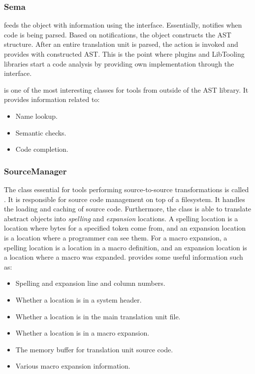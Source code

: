 \subsubsection{Sema}
 feeds the  object with information using the  interface. Essentially,  notifies  when code is being parsed. Based on notifications, the  object constructs the AST structure. After an entire translation unit is parsed, the  action is invoked and  provides  with constructed AST. This is the point where plugins and LibTooling libraries start a code analysis by providing own  implementation through the  interface.

 is one of the most interesting classes for tools from outside of the AST library. It provides information related to:

\begin{itemize}
\item Name lookup.
\item Semantic checks.
\item Code completion.
\end{itemize}

\subsubsection{SourceManager}
The class essential for tools performing source-to-source transformations is called . It is responsible for source code management on top of a filesystem. It handles the loading and caching of source code. Furthermore, the class is able to translate abstract  objects into \emph{spelling} and \emph{expansion} locations. A spelling location is a location where bytes for a specified token come from, and an expansion location is a location where a programmer can see them. For a macro expansion, a spelling location is a location in a macro definition, and an expansion location is a location where a macro was expanded.  provides some useful information such as:

\begin{itemize}
\item Spelling and expansion line and column numbers.
\item Whether a location is in a system header.
\item Whether a location is in the main translation unit file.
\item Whether a location is in a macro expansion.
\item The memory buffer for translation unit source code.
\item Various macro expansion information.
\end{itemize}

